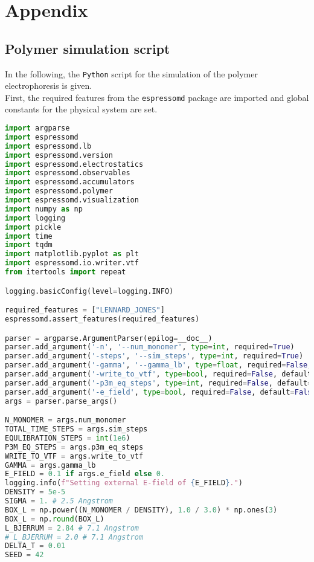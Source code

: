 \onecolumn
\lstset{basicstyle=\footnotesize\ttfamily, breaklines=true}
\section{Appendix}
\subsection{Polymer simulation script}
In the following, the \texttt{Python} script for the simulation of the polymer electrophoresis is given. \\
First, the required features from the \texttt{espressomd} package are imported and global constants for the physical system are set. 
\begin{lstlisting}[language=python]
import argparse
import espressomd
import espressomd.lb
import espressomd.version
import espressomd.electrostatics
import espressomd.observables
import espressomd.accumulators
import espressomd.polymer
import espressomd.visualization
import numpy as np
import logging
import pickle
import time
import tqdm
import matplotlib.pyplot as plt
import espressomd.io.writer.vtf
from itertools import repeat

logging.basicConfig(level=logging.INFO)

required_features = ["LENNARD_JONES"]
espressomd.assert_features(required_features)

parser = argparse.ArgumentParser(epilog=__doc__)
parser.add_argument('-n', '--num_monomer', type=int, required=True)
parser.add_argument('-steps', '--sim_steps', type=int, required=True)
parser.add_argument('-gamma', '--gamma_lb', type=float, required=False, default=20.)
parser.add_argument('-write_to_vtf', type=bool, required=False, default=False)
parser.add_argument('-p3m_eq_steps', type=int, required=False, default=1000000)
parser.add_argument('-e_field', type=bool, required=False, default=False)
args = parser.parse_args()

N_MONOMER = args.num_monomer
TOTAL_TIME_STEPS = args.sim_steps
EQULIBRATION_STEPS = int(1e6)
P3M_EQ_STEPS = args.p3m_eq_steps
WRITE_TO_VTF = args.write_to_vtf
GAMMA = args.gamma_lb
E_FIELD = 0.1 if args.e_field else 0.
logging.info(f"Setting external E-field of {E_FIELD}.")
DENSITY = 5e-5
SIGMA = 1. # 2.5 Angstrom
BOX_L = np.power((N_MONOMER / DENSITY), 1.0 / 3.0) * np.ones(3)
BOX_L = np.round(BOX_L)
L_BJERRUM = 2.84 # 7.1 Angstrom
# L_BJERRUM = 2.0 # 7.1 Angstrom
DELTA_T = 0.01
SEED = 42
\end{lstlisting}
